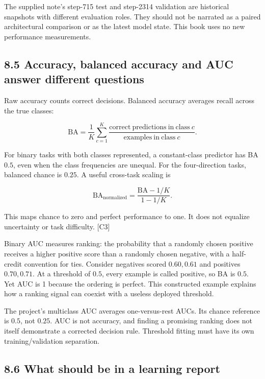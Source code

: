 \documentclass[
  11pt,
]{article}
\let\oldsubsection\subsection
\renewcommand{\subsection}{\Needspace{6\baselineskip}\oldsubsection}
\begin{document}
The supplied note's step-715 test and step-2314 validation are
historical snapshots with different evaluation roles. They should not be
narrated as a paired architectural comparison or as the latest model
state. This book uses no new performance measurements.

\subsection{8.5 Accuracy, balanced accuracy and AUC answer different
questions}\label{accuracy-balanced-accuracy-and-auc-answer-different-questions}

Raw accuracy counts correct decisions. Balanced accuracy averages recall
across the true classes:

\[\mathrm{BA}=\frac1K\sum_{c=1}^{K}\frac{\mathrm{correct\ predictions\ in\ class}\ c}{\mathrm{examples\ in\ class}\ c}.\]

For binary tasks with both classes represented, a constant-class
predictor has BA \(0.5\), even when the class frequencies are unequal.
For the four-direction tasks, balanced chance is \(0.25\). A useful
cross-task scaling is

\[\mathrm{BA}_{\mathrm{normalized}}=\frac{\mathrm{BA}-1/K}{1-1/K}.\]

This maps chance to zero and perfect performance to one. It does not
equalize uncertainty or task difficulty. {[}C3{]}

Binary AUC measures ranking: the probability that a randomly chosen
positive receives a higher positive score than a randomly chosen
negative, with a half-credit convention for ties. Consider negatives
scored \(0.60,0.61\) and positives \(0.70,0.71\). At a threshold of
\(0.5\), every example is called positive, so BA is \(0.5\). Yet AUC is
1 because the ordering is perfect. This constructed example explains how
a ranking signal can coexist with a useless deployed threshold.

The project's multiclass AUC averages one-versus-rest AUCs. Its chance
reference is \(0.5\), not \(0.25\). AUC is not accuracy, and finding a
promising ranking does not itself demonstrate a corrected decision rule.
Threshold fitting must have its own training/validation separation.

\subsection{8.6 What should be in a learning
report}\label{what-should-be-in-a-learning-report}
\end{document}

